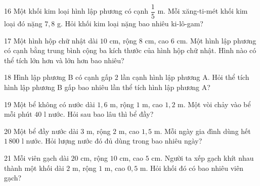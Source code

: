 \gap
\begin{probbox}{16}{\relax}
Một khối kim loại hình lập phương có cạnh $\dfrac15$ m. Mỗi xăng-ti-mét khối kim loại đó nặng $7{,}8$ g. Hỏi khối kim loại nặng bao nhiêu ki-lô-gam?
\end{probbox}
\gap
\begin{probbox}{17}{\relax}
Một hình hộp chữ nhật dài $10$ cm, rộng $8$ cm, cao $6$ cm. Một hình lập phương có cạnh bằng trung bình cộng ba kích thước của hình hộp chữ nhật. Hình nào có thể tích lớn hơn và lớn hơn bao nhiêu?
\end{probbox}
\gap
\begin{probbox}{18}{\relax}
Hình lập phương B có cạnh gấp $2$ lần cạnh hình lập phương A. Hỏi thể tích hình lập phương B gấp bao nhiêu lần thể tích hình lập phương A?
\end{probbox}
\gap
\begin{probbox}{19}{\relax}
Một bể không có nước dài $1{,}6$ m, rộng $1$ m, cao $1{,}2$ m. Một vòi chảy vào bể mỗi phút $40$ l nước. Hỏi sau bao lâu thì bể đầy?
\end{probbox}
\gap
\begin{probbox}{20}{\relax}
Một bể đầy nước dài $3$ m, rộng $2$ m, cao $1{,}5$ m. Mỗi ngày gia đình dùng hết $1\,800$ l nước. Hỏi lượng nước đó đủ dùng trong bao nhiêu ngày?
\end{probbox}
\gap
\begin{probbox}{21}{\relax}
Mỗi viên gạch dài $20$ cm, rộng $10$ cm, cao $5$ cm. Người ta xếp gạch khít nhau thành một khối dài $2$ m, rộng $1$ m, cao $0{,}5$ m. Hỏi khối đó có bao nhiêu viên gạch?
\end{probbox}
